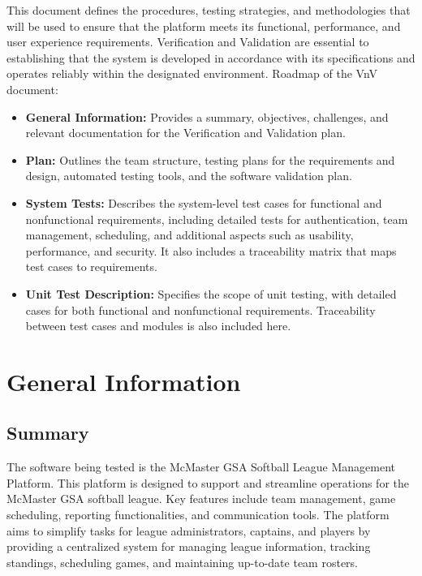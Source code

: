 \documentclass[12pt, titlepage]{article}
\begin{document}
\newpage


This document defines the procedures, testing strategies, and methodologies that will be used to ensure that the platform meets its functional, performance, and user experience requirements. Verification and Validation are essential to establishing that the system is developed in accordance with its specifications and operates reliably within the designated environment.
Roadmap of the VnV document:
\begin{itemize}
    \item \textbf{General Information:} Provides a summary, objectives, challenges, and relevant documentation for the Verification and Validation plan.
    \item \textbf{Plan:} Outlines the team structure, testing plans for the requirements and design, automated testing tools, and the software validation plan.
    \item \textbf{System Tests:} Describes the system-level test cases for functional and nonfunctional requirements, including detailed tests for authentication, team management, scheduling, and additional aspects such as usability, performance, and security. It also includes a traceability matrix that maps test cases to requirements.
    \item \textbf{Unit Test Description:} Specifies the scope of unit testing, with detailed cases for both functional and nonfunctional requirements. Traceability between test cases and modules is also included here.
\end{itemize}

\section{General Information}

\subsection{Summary}

The software being tested is the McMaster GSA Softball League Management Platform. This platform is designed to support and streamline operations for the McMaster GSA softball league. Key features include team management, game scheduling, reporting functionalities, and communication tools. The platform aims to simplify tasks for league administrators, captains, and players by providing a centralized system for managing league information, tracking standings, scheduling games, and maintaining up-to-date team rosters.
\end{document}
